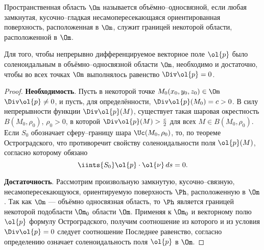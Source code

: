 \documentclass[a4paper]{article}
\begin{document}
Пространственная область $\Om$ называется объёмно--односвязной, если
любая замкнутая, кусочно--гладкая несамопересекающаяся
ориентированная поверхность, расположенная в $\Om$, служит границей
некоторой области, расположенной в $\Om$.

\begin{theorem}
Для того, чтобы непрерывно дифференцируемое векторное поле $\ol{p}$
было соленоидальным в объёмно--односвязной области $\Om$, необходимо
и достаточно, чтобы во всех точках $\Om$ выполнялось равенство
$\Div\ol{p}=0$.
\end{theorem}

\begin{proof}
\textbf{Необходимость}. Пусть в некоторой точке
$M_0(x_0,y_0,z_0)\in\Om$ $\Div\ol{p}\ne0$, и пусть, для
определённости, $\Div\ol{p}(M_0)=c>0$. В силу непрерывности функции
$\Div\ol{p}(M)$, существует такая шаровая окрестность
$B(M_0,\rho_0)$, $\rho_0>0$, в которой $\Div\ol{p}(M)>\frac{c}2$ для
всех $M\in B(M_0,\rho_0)$. Если $S_0$ обозначает сферу--границу шара
$\Uc(M_0,\rho_0)$, то, по теореме Остроградского,
 что противоречит свойству соленоидальности поля $\ol{p}(M)$,
согласно которому обязано $$\iints{S_0}\ol{p}\cdot\ol{\nu}\,ds=0.$$

\textbf{Достаточность}. Рассмотрим произвольную замкнутую,
кусочно--связную, несамопересекающуюся, ориентируемую поверхность
$\Ph$, расположенную в $\Om$. Так как $\Om$ --- объёмно односвязная
область, то $\Ph$ является границей некоторой подобласти $\Om_0$
области $\Om$. Применяя к $\Om_0$ и векторному полю $\ol{p}$ формулу
Остроградского, получим соотношение
 из которого и из условия
$\Div\ol{p}=0$ следует соотношение
 Последнее равенство,
согласно определению означает соленоидальность поля $\ol{p}$ в
$\Om$.
\end{proof}
\end{document}
